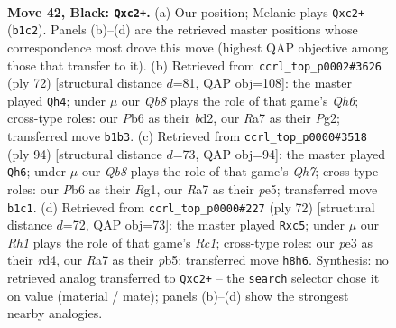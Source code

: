 \documentclass[11pt]{article}
\begin{document}
\clearpage

\begin{figure}[p]\centering
\begin{subfigure}{0.46\textwidth}\centering
\resizebox{\linewidth}{!}{%
\newchessgame
\chessboard[
  setfen={7r/r3k3/1pp3p1/4p1p1/Pp1PK3/4P3/R1Q5/1qB5 b - - 5 42},
  showmover=false,
  pgfstyle=straightmove, color=movearrow, markmove={b1-c2}
]}
\caption{}
\end{subfigure}\hfill
\begin{subfigure}{0.46\textwidth}\centering
\resizebox{\linewidth}{!}{%
\newchessgame
\chessboard[
  setfen={6k1/1b3p1p/p4p1Q/1p1P1Pq1/4p1R1/3P2P1/3b2P1/7K w - - 2 37},
  showmover=false,
  pgfstyle=straightmove, color=movearrow, markmove={h6-h4}
]}
\caption{}
\end{subfigure}
\\[4pt]
\begin{subfigure}{0.46\textwidth}\centering
\resizebox{\linewidth}{!}{%
\newchessgame
\chessboard[
  setfen={6r1/4kq1Q/3p2p1/p2Pp2p/Pp5P/1P6/2P5/1K4R1 w - - 9 48},
  showmover=false,
  pgfstyle=straightmove, color=movearrow, markmove={h7-h6}
]}
\caption{}
\end{subfigure}\hfill
\begin{subfigure}{0.46\textwidth}\centering
\resizebox{\linewidth}{!}{%
\newchessgame
\chessboard[
  setfen={6k1/5qp1/4Q2p/1pb2P2/p2r4/P2P3P/1P6/2R4K w - - 0 37},
  showmover=false,
  pgfstyle=straightmove, color=movearrow, markmove={c1-c5}
]}
\caption{}
\end{subfigure}
\caption{\textbf{Move 42, Black: \texttt{Qxc2+}.} (a) Our position; Melanie plays \texttt{Qxc2+} (\texttt{b1c2}). Panels (b)--(d) are the retrieved master positions whose correspondence most drove this move (highest QAP objective among those that transfer to it). (b) Retrieved from \texttt{ccrl\_top\_p0002\#3626} (ply 72) [structural distance $d$=81, QAP obj=108]: the master played \texttt{Qh4}; under $\mu$ our \emph{Qb8} plays the role of that game's \emph{Qh6}; cross-type roles: our \emph{P}b6 as their \emph{b}d2, our \emph{R}a7 as their \emph{P}g2; transferred move \texttt{b1b3}. (c) Retrieved from \texttt{ccrl\_top\_p0000\#3518} (ply 94) [structural distance $d$=73, QAP obj=94]: the master played \texttt{Qh6}; under $\mu$ our \emph{Qb8} plays the role of that game's \emph{Qh7}; cross-type roles: our \emph{P}b6 as their \emph{R}g1, our \emph{R}a7 as their \emph{p}e5; transferred move \texttt{b1c1}. (d) Retrieved from \texttt{ccrl\_top\_p0000\#227} (ply 72) [structural distance $d$=72, QAP obj=73]: the master played \texttt{Rxc5}; under $\mu$ our \emph{Rh1} plays the role of that game's \emph{Rc1}; cross-type roles: our \emph{p}e3 as their \emph{r}d4, our \emph{R}a7 as their \emph{p}b5; transferred move \texttt{h8h6}. Synthesis: no retrieved analog transferred to \texttt{Qxc2+} -- the \texttt{search} selector chose it on value (material / mate); panels (b)--(d) show the strongest nearby analogies.}
\label{fig:thought-m83}
\end{figure}
\end{document}
